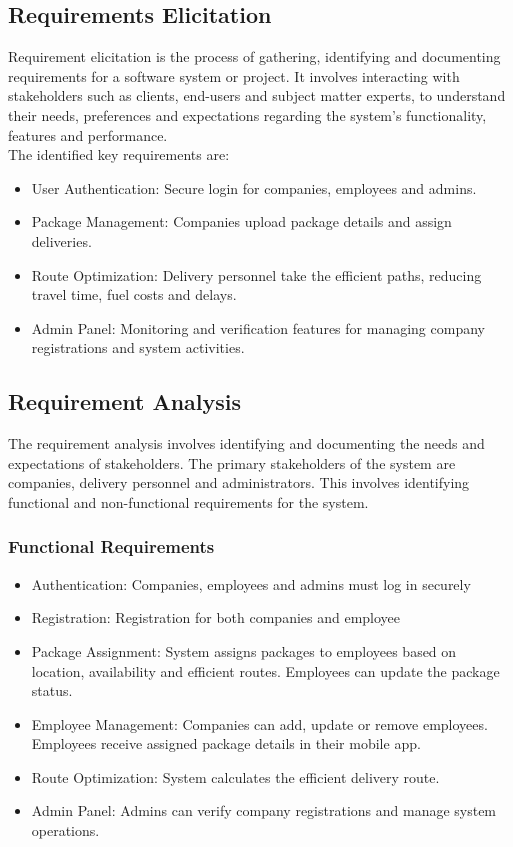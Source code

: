 \subsection{Requirements Elicitation}
Requirement elicitation is the process of gathering, identifying and documenting requirements for a software system or project. It involves interacting with stakeholders such as clients, end-users and subject matter experts, to understand their needs,
preferences and expectations regarding the system’s functionality, features and
performance.\\
The identified key requirements are:
\begin{itemize}
    \item User Authentication: Secure login for companies, employees and admins.
    \item Package Management: Companies upload package details and assign deliveries.
    \item Route Optimization: Delivery personnel take the efficient paths, reducing travel time, fuel costs and delays.
    \item Admin Panel: Monitoring and verification features for managing company registrations and system activities.
\end{itemize}
\subsection{Requirement Analysis}
The requirement analysis involves identifying and documenting the needs and expectations of stakeholders. The primary stakeholders of the system are companies, delivery personnel and administrators.
This involves identifying functional and
non-functional requirements for the system.
\subsubsection{Functional Requirements}
\begin{itemize}
    \item Authentication: Companies, employees and admins must log in securely
    \item Registration: Registration for both companies and employee
    \item Package Assignment: System assigns packages to employees based on location, availability and efficient routes. Employees can update the package status.
    \item Employee Management: Companies can add, update or remove employees. Employees receive assigned package details in their mobile app.
    \item Route Optimization: System calculates the efficient delivery route.
    \item Admin Panel: Admins can verify company registrations and manage system operations.
\end{itemize}
